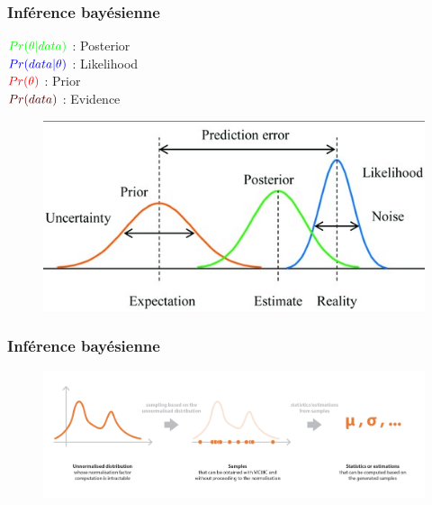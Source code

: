 \documentclass[aspectratio=169,professionalfonts, 12pt]{beamer}
\begin{document}
\begin{frame}
  \frametitle{Inférence bayésienne}
  \begin{minipage}{0.3\textwidth}
  \begin{block}{}
    \(\displaystyle \color{green} Pr(\theta|data) \) : Posterior \\
    \(\displaystyle \color{blue} Pr(data|\theta) \) : Likelihood \\
    \(\displaystyle \color{red}Pr(\theta) \) : Prior \\
    \(\displaystyle \color{blueforest} Pr(data) \) : Evidence \\
  \end{block}
  \end{minipage}
  \begin{minipage}{2cm}
  
  \end{minipage}
  \begin{minipage}{0.6\textwidth}
    \begin{figure}[t]
    \begin{center}
      \includegraphics[width=\textwidth]{images/etat_art/bayesian_figure.jpg}
    \end{center}
    \end{figure} 
  \end{minipage}	
\end{frame}

\begin{frame}
  \frametitle{Inférence bayésienne}
  \begin{minipage}{\textwidth}
    \begin{figure}[H]
    \begin{center}
      \includegraphics[width=\textwidth]{images/etat_art/mcmc_illustration.png}
    \end{center}
    \end{figure} 
  \end{minipage}	
\end{frame}
\end{document}
